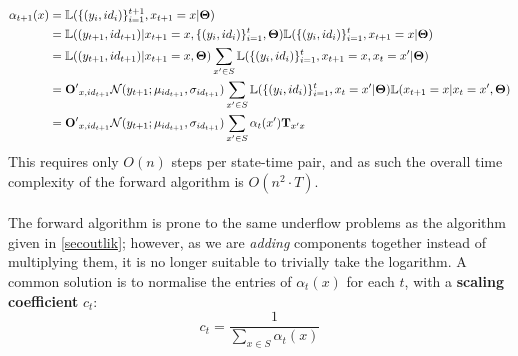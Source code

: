 \documentclass[12pt,a4paper,twoside,openright]{report}
\begin{document}
\[\begin{aligned}
\alpha_{t+1}(x) & = \mathbb{L}(\{(y_i, id_i)\}_{i=1}^{t+1}, x_{t+1} = x|{\bf \Theta})\\
& = \mathbb{L}((y_{t+1}, id_{t+1}) | x_{t+1} = x, \{(y_i, id_i)\}_{i=1}^{t}, {\bf \Theta})\mathbb{L}(\{(y_i, id_i)\}_{i=1}^{t}, x_{t+1} = x|{\bf \Theta})\\
& = \mathbb{L}((y_{t+1}, id_{t+1}) | x_{t+1} = x, {\bf \Theta})\sum_{x' \in S}{\mathbb{L}(\{(y_i, id_i)\}_{i=1}^{t}, x_{t+1} = x, x_t = x'|{\bf \Theta})}\\
& = {\bf O'}_{x,id_{t+1}}\mathcal{N}(y_{t+1}; \mu_{id_{t+1}}, \sigma_{id_{t+1}})\sum_{x' \in S}{\mathbb{L}(\{(y_i, id_i)\}_{i=1}^{t}, x_t = x'|{\bf \Theta})\mathbb{L}(x_{t+1} = x|x_t = x', {\bf \Theta})}\\
& = {\bf O'}_{x,id_{t+1}}\mathcal{N}(y_{t+1}; \mu_{id_{t+1}}, \sigma_{id_{t+1}})\sum_{x' \in S}{\alpha_t(x'){\bf T}_{x'x}}\\
\end{aligned}\]
This requires only $O(n)$ steps per state-time pair, and as such the overall time complexity of the forward algorithm is $O(n^2\cdot T)$.\\ \\
The forward algorithm is prone to the same underflow problems as the algorithm given in \cref{secoutlik}; however, as we are \emph{adding} components together instead of multiplying them, it is no longer suitable to trivially take the logarithm. A common solution is to normalise the entries of $\alpha_t(x)$ for each $t$, with a {\bf scaling coefficient} $c_t$:
\[c_t = \frac{1}{\sum\limits_{x\in S}{\alpha_t(x)}}\]
\end{document}
